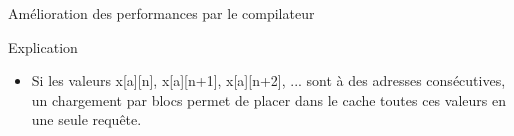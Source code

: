 \begin{Frame}{Amélioration des performances par le compilateur}
\begin{alertblock}{Explication}
       \begin{center}
 	\begin{itemize}
         \item Si les valeurs x[a][n], x[a][n+1], x[a][n+2], ... sont à des adresses consécutives, un chargement par blocs permet de placer dans le cache toutes ces valeurs en une seule requête.
        \end{itemize}
       \end{center}
      \end{alertblock}   


\end{Frame}


